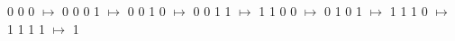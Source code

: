 0 0 0 $\mapsto$ 0    
0 0 1 $\mapsto$ 0    
0 1 0 $\mapsto$ 0    
0 1 1 $\mapsto$ 1    
1 0 0 $\mapsto$ 0    
1 0 1 $\mapsto$ 1    
1 1 0 $\mapsto$ 1    
1 1 1 $\mapsto$ 1    
